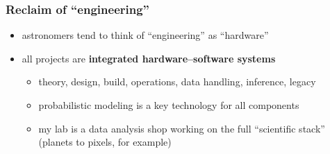 \documentclass{beamer}
\renewcommand{\emph}[1]{\textbf{#1}}
\begin{document}
\begin{frame}
  \frametitle{Reclaim of ``engineering''}
  \begin{itemize}
  \item astronomers tend to think of ``engineering'' as ``hardware''
  \item all projects are \emph{integrated hardware--software systems}
    \begin{itemize}
    \item theory, design, build, operations, data handling, inference, legacy
    \item probabilistic modeling is a key technology for all components
    \item my lab is a data analysis shop working on the full ``scientific stack'' (planets to pixels, for example)
    \end{itemize}
  \end{itemize}
\end{frame}
\end{document}
